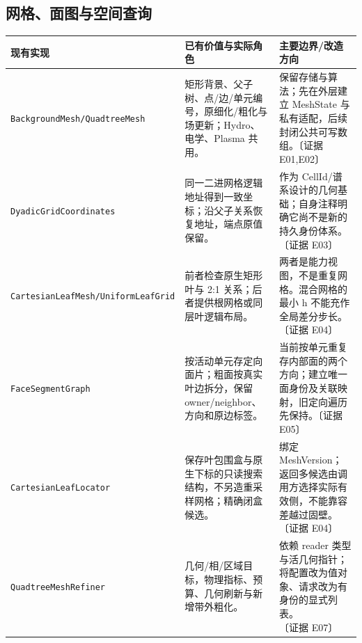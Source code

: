 \documentclass[UTF8,a4paper,11pt,fontset=fandol]{ctexart}
\newcommand{\code}[1]{\nolinkurl{#1}}
\newcommand{\ev}[1]{{\small\color{muted}〔证据 #1〕}}
\begin{document}
\subsection{网格、面图与空间查询}
\begin{longtable}{@{}P{.24\textwidth}P{.37\textwidth}P{.33\textwidth}@{}}
\toprule 现有实现 & 已有价值与实际角色 & 主要边界/改造方向\\\midrule\endhead
\code{BackgroundMesh/QuadtreeMesh} & 矩形背景、父子树、点/边/单元编号，原细化/粗化与场更新；Hydro、电学、Plasma 共用。 & 保留存储与算法；先在外层建立 MeshState 与私有适配，后续封闭公共可写数组。\ev{E01,E02}\\
\code{DyadicGridCoordinates} & 同一二进网格逻辑地址得到一致坐标；沿父子关系恢复地址，端点原值保留。 & 作为 CellId/谱系设计的几何基础；自身注释明确它尚不是新的持久身份体系。\ev{E03}\\
\code{CartesianLeafMesh/UniformLeafGrid} & 前者检查原生矩形叶与 2:1 关系；后者提供根网格或同层叶逻辑布局。 & 两者是能力视图，不是重复网格。混合网格的最小 h 不能充作全局差分步长。\ev{E04}\\
\code{FaceSegmentGraph} & 按活动单元存定向面片；粗面按真实叶边拆分，保留 owner/neighbor、方向和原边标签。 & 当前按单元重复存内部面的两个方向；建立唯一面身份及关联映射，旧定向遍历先保持。\ev{E05}\\
\code{CartesianLeafLocator} & 保存叶包围盒与原生下标的只读搜索结构，不另造重采样网格；精确闭盒候选。 & 绑定 MeshVersion；返回多候选由调用方选择实际有效侧，不能靠容差越过固壁。\ev{E04}\\
\code{QuadtreeMeshRefiner} & 几何/相/区域目标，物理指标、预算、几何刷新与新增带外粗化。 & 依赖 reader 类型与活几何指针；将配置改为值对象、请求改为有身份的显式列表。\ev{E07}\\
\bottomrule
\end{longtable}
\end{document}

